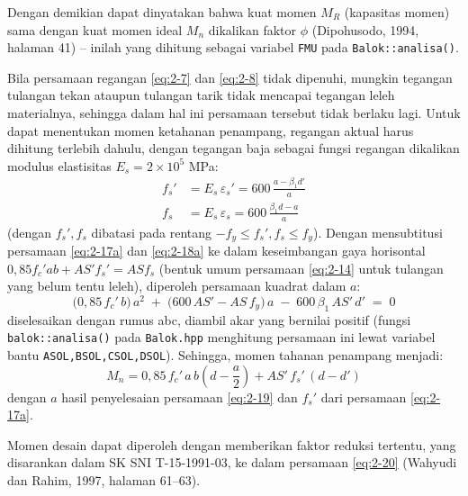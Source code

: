 Dengan demikian dapat dinyatakan bahwa kuat momen $M_R$ (kapasitas momen)
sama dengan kuat momen ideal $M_n$ dikalikan faktor $\phi$ (Dipohusodo,
1994, halaman 41) -- inilah yang dihitung sebagai variabel \texttt{FMU}
pada \texttt{Balok::analisa()}.

Bila persamaan regangan \eqref{eq:2-7} dan \eqref{eq:2-8} tidak dipenuhi,
mungkin tegangan tulangan tekan ataupun tulangan tarik tidak mencapai
tegangan leleh materialnya, sehingga dalam hal ini persamaan tersebut
tidak berlaku lagi. Untuk dapat menentukan momen ketahanan penampang,
regangan aktual harus dihitung terlebih dahulu, dengan tegangan baja
sebagai fungsi regangan dikalikan modulus elastisitas $E_s = 2 \times
10^5$ MPa:
\begin{align}
f_s' &= E_s\,\varepsilon_s' = 600\,\frac{a-\beta_1 d'}{a} \label{eq:2-17a}\\
f_s &= E_s\,\varepsilon_s = 600\,\frac{\beta_1 d - a}{a} \label{eq:2-18a}
\end{align}
(dengan $f_s', f_s$ dibatasi pada rentang $-f_y \le f_s',f_s \le f_y$).
Dengan mensubtitusi persamaan \eqref{eq:2-17a} dan \eqref{eq:2-18a} ke
dalam keseimbangan gaya horisontal $0{,}85f_c'ab + AS'f_s' = AS f_s$
(bentuk umum persamaan \eqref{eq:2-14} untuk tulangan yang belum tentu
leleh), diperoleh persamaan kuadrat dalam $a$:
\begin{equation}
\bigl(0{,}85\,f_c'\,b\bigr)\,a^2 \;+\; \bigl(600\,AS' - AS\,f_y\bigr)\,a
\;-\; 600\,\beta_1\,AS'\,d' \;=\; 0
\label{eq:2-19}
\end{equation}
diselesaikan dengan rumus abc, diambil akar yang bernilai positif (fungsi
\texttt{balok::analisa()} pada \texttt{Balok.hpp} menghitung persamaan ini
lewat variabel bantu \texttt{ASOL,BSOL,CSOL,DSOL}). Sehingga, momen
tahanan penampang menjadi:
\begin{equation}
M_n = 0{,}85\,f_c'\,a\,b\left(d-\frac{a}{2}\right) + AS'\,f_s'\,(d-d')
\label{eq:2-20}
\end{equation}
dengan $a$ hasil penyelesaian persamaan \eqref{eq:2-19} dan $f_s'$ dari
persamaan \eqref{eq:2-17a}.

Momen desain dapat diperoleh dengan memberikan faktor reduksi tertentu,
yang disarankan dalam SK SNI T-15-1991-03, ke dalam persamaan
\eqref{eq:2-20} (Wahyudi dan Rahim, 1997, halaman 61--63).

